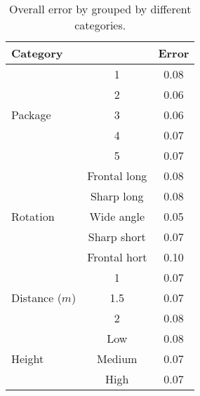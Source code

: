 \begin{table}%
\centering
\begin{tabular}{lcc}
\toprule
\multicolumn{2}{l}{Category} & Error\\
\midrule

\multirow{5}{*}{Package} 
& 1 & 0.08  \\
& 2 & 0.06  \\
& 3 & 0.06  \\
& 4 & 0.07  \\
& 5 & 0.07  \\
\midrule

\multirow{5}{*}{Rotation}
& Frontal long		& 0.08 \\ 
& Sharp long		& 0.08 \\
& Wide angle 		& 0.05 \\
& Sharp short 		& 0.07 \\
& Frontal hort		& 0.10 \\
\midrule
\multirow{3}{*}{Distance ($m$)} 
& 1 			& 0.07 \\
& 1.5  			& 0.07 \\
& 2 			& 0.08 \\
\midrule
\multirow{3}{*}{Height} 
& Low 		& 0.08 \\
& Medium 	& 0.07 \\
& High		& 0.07 \\
\bottomrule
 \end{tabular}
 \caption{Overall error by grouped by different categories.}
\label{table:overall_categories_error}
\end{table}